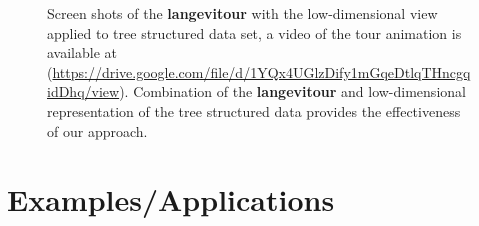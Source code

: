 \documentclass[
  12pt]{article}
\begin{document}
\begin{figure}
\begin{minipage}[t]{0.33\linewidth}
{{}

}

\end{minipage}%
%
\begin{minipage}[t]{0.33\linewidth}

{\centering 


}

\end{minipage}%

\caption{\label{fig-exp2_sc}Screen shots of the \textbf{langevitour}
with the low-dimensional view applied to tree structured data set, a
video of the tour animation is available at
(\url{https://drive.google.com/file/d/1YQx4UGlzDify1mGqeDtlqTHncgqidDhq/view}).
Combination of the \textbf{langevitour} and low-dimensional
representation of the tree structured data provides the effectiveness of
our approach.}

\end{figure}

\hypertarget{sec-applications}{%
\section{Examples/Applications}\label{sec-applications}}
\end{document}
